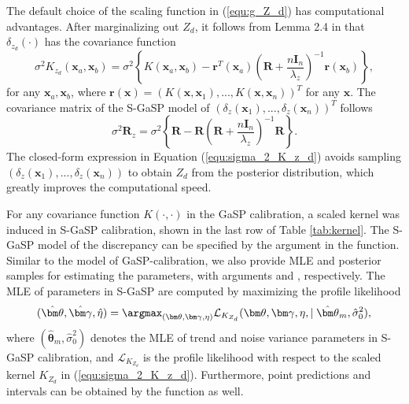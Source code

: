 The default choice of the scaling function in (\ref{equ:g_Z_d})  has computational advantages.  After marginalizing out $Z_d$, it follows from  Lemma 2.4 in \cite{gu2018sgasp} that $\delta_{z_d}(\cdot)$  has the covariance function  
\begin{equation}
\sigma^2 K_{z_d}(\mathbf x_a, \mathbf x_b)=\sigma^2 \left\{K(\mathbf x_a,\mathbf x_b ) - \mathbf r^T(\mathbf x_a)  \left(\mathbf R+\frac{n\mathbf I_n}{\lambda_z} \right)^{-1} \mathbf r(\mathbf x_b)\right\},
\label{equ:sigma_2_K_z_d}
\end{equation}
for any $\mathbf x_a, \mathbf x_b $,  where $\mathbf r(\mathbf x)=(K(\mathbf x, \mathbf x_1),...,K(\mathbf x, \mathbf x_n))^T$ for any $\mathbf x$. The covariance matrix of the S-GaSP model of $(\delta_z(\mathbf x_1),..., \delta_z(\mathbf x_n))^T$ follows
\begin{equation}
\sigma^2 \mathbf R_z=\sigma^2  \left\{\mathbf R- \mathbf R   \left(\mathbf R+\frac{n\mathbf I_n}{\lambda_z} \right)^{-1}\mathbf R\right\}.    
 \label{equ:R_z}
 \end{equation}
 The closed-form expression in Equation (\ref{equ:sigma_2_K_z_d}) avoids sampling $(\delta_z(\mathbf x_1),...,\delta_z(\mathbf x_n))$ to obtain $Z_d$ from the posterior distribution, which greatly improves the computational speed. 


For any covariance function $K(\cdot,\cdot)$ in the GaSP calibration, a scaled kernel was induced in S-GaSP calibration, shown in the last row of Table \ref{tab:kernel}. The S-GaSP model of the discrepancy can be specified by the argument  in the  function. Similar to the model of GaSP-calibration, we also provide MLE and posterior samples for estimating the parameters, with arguments   and , respectively.  The MLE of parameters in S-GaSP are computed by maximizing the profile likelihood 
\begin{equation}
(\hat {\bm \theta}, \hat {\bm \gamma}, \hat \eta ) =\argmax_{(\bm \theta, \bm \gamma, \eta)} \mathcal L_{K_{Z_d}}( \bm \theta, \bm \gamma, \eta, \mid { \hat {\bm \theta}_m},\hat \sigma^2_0 ),   
\label{equ:MLE_SGaSP} 
\end{equation}
where  $({ \hat {\bm \theta}_m}, \hat \sigma^2_0)$ denotes the MLE  of trend  and noise variance parameters in S-GaSP calibration, and $\mathcal L_{K_{Z_d}}$ is the profile likelihood with respect to the scaled kernel $K_{Z_d}$ in (\ref{equ:sigma_2_K_z_d}). Furthermore, point predictions and intervals can be obtained by the  function as well. 

